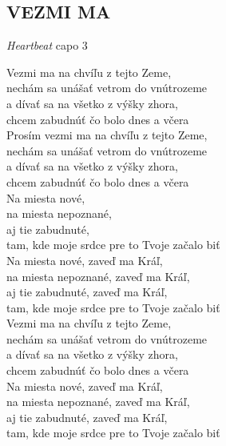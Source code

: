 \begin{flushleft}
	\section*{\Huge VEZMI MA}
	\emph{Heartbeat} \hspace{12cm} capo 3
\end{flushleft}


Vezmi ma na chvíľu z tejto Zeme, \\
nechám sa unášať vetrom do vnútrozeme \\
a dívať sa na všetko z výšky zhora, \\
chcem zabudnúť čo bolo dnes a včera \\

Prosím vezmi ma na chvíľu z tejto Zeme, \\
nechám sa unášať vetrom do vnútrozeme \\
a dívať sa na všetko z výšky zhora, \\
chcem zabudnúť čo bolo dnes a včera \\

Na miesta nové, \\
na miesta nepoznané, \\
aj tie zabudnuté, \\
tam, kde moje srdce pre to Tvoje začalo biť \\

Na miesta nové, zaveď ma Kráľ, \\
na miesta nepoznané, zaveď ma Kráľ, \\
aj tie zabudnuté, zaveď ma Kráľ, \\
tam, kde moje srdce pre to Tvoje začalo biť \\

Vezmi ma na chvíľu z tejto Zeme, \\
nechám sa unášať vetrom do vnútrozeme \\
a dívať sa na všetko z výšky zhora, \\
chcem zabudnúť čo bolo dnes a včera \\

Na miesta nové, zaveď ma Kráľ, \\
na miesta nepoznané, zaveď ma Kráľ, \\
aj tie zabudnuté, zaveď ma Kráľ, \\
tam, kde moje srdce pre to Tvoje začalo biť

\newpage
